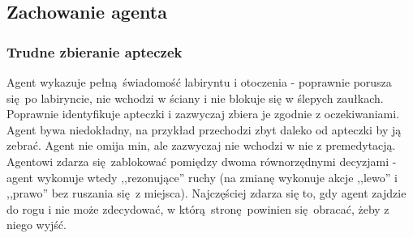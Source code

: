 \begin{figure}[H]
\end{figure}

\begin{figure}[H]
\end{figure}

\begin{figure}[H]
\end{figure}

\subsection{Zachowanie agenta}
\subsubsection{Trudne zbieranie apteczek}
Agent wykazuje pełną świadomość labiryntu i otoczenia - poprawnie porusza się po labiryncie, nie wchodzi w ściany i nie blokuje się w ślepych zaułkach. Poprawnie identyfikuje apteczki i zazwyczaj zbiera je zgodnie z oczekiwaniami. Agent bywa niedokładny, na przykład przechodzi zbyt daleko od apteczki by ją zebrać. Agent nie omija min, ale zazwyczaj nie wchodzi w nie z premedytacją. Agentowi zdarza się zablokować pomiędzy dwoma równorzędnymi decyzjami - agent wykonuje wtedy ,,rezonujące'' ruchy (na zmianę wykonuje akcje ,,lewo'' i ,,prawo'' bez ruszania się z miejsca). Najczęściej zdarza się to, gdy agent zajdzie do rogu i nie może zdecydować, w którą stronę powinien się obracać, żeby z niego wyjść.

